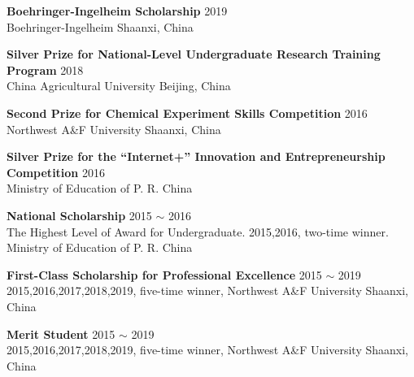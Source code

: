 \textbf{Boehringer-Ingelheim Scholarship} \hfill 2019 \\
{\small Boehringer-Ingelheim \hfill Shaanxi, China}
    
\vspace{5pt}

\textbf{Silver Prize for National-Level Undergraduate Research Training Program} \hfill 2018 \\
{\small China Agricultural University \hfill Beijing, China}

\vspace{5pt}




\vspace{5pt}

\textbf{Second Prize for Chemical Experiment Skills Competition} \hfill 2016 \\
{\small Northwest A\&F University \hfill Shaanxi, China}

\vspace{5pt}

\textbf{Silver Prize for the ``Internet+'' Innovation and Entrepreneurship Competition} \hfill 2016 \\
{\small \hfill Ministry of Education of P. R. China}

\vspace{5pt}

\textbf{National Scholarship} \hfill 2015 $\sim$ 2016 \\
{\small The Highest Level of Award for Undergraduate. 2015,2016, two-time winner. \hfill Ministry of Education of P. R. China}\\


\vspace{5pt}

\textbf{First-Class Scholarship for Professional Excellence} \hfill 2015 $\sim$ 2019 \\
{\small 2015,2016,2017,2018,2019, five-time winner, Northwest A\&F University \hfill Shaanxi, China}

\vspace{5pt}

\textbf{Merit Student} \hfill 2015 $\sim$ 2019 \\
{\small 2015,2016,2017,2018,2019, five-time winner, Northwest A\&F University \hfill Shaanxi, China}
